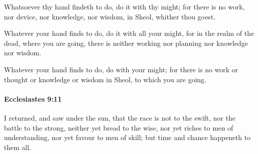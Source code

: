 			\begin{versebox}
					\item[BHS] 
					\item[LXX] 
					\item[ASV] Whatsoever thy hand findeth to do, do it with thy might; for there is no work, nor device, nor knowledge, nor wisdom, in Sheol, whither thou goest.
					\item[NIV] Whatever your hand finds to do, do it with all your might, for in the realm of the dead, where you are going, there is neither working nor planning nor knowledge nor wisdom.
					\item[NRSV] Whatever your hand finds to do, do with your might; for there is no work or thought or knowledge or wisdom in Sheol, to which you are going.
			\end{versebox}

		\paragraph{Ecclesiastes 9:11} %
			\label{ECCLESIASTES-9-11}

			I returned, and saw under the sun, that the race is not to the swift, nor the battle to the strong, neither yet bread to the wise, nor yet riches to men of understanding, nor yet favour to men of skill; but time and chance happeneth to them all.

